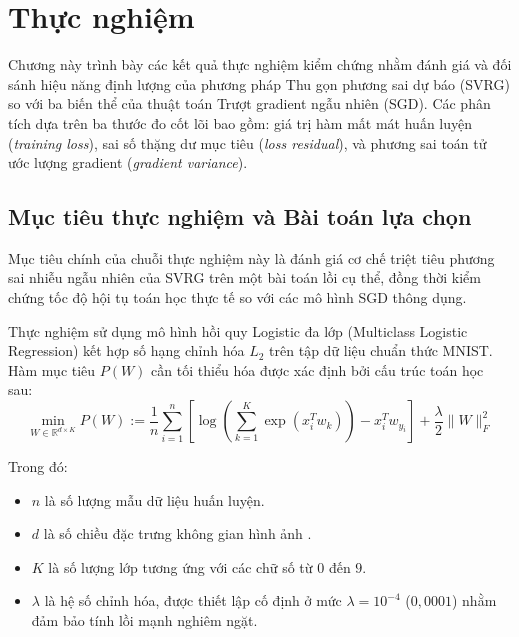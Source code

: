 \chapter{Thực nghiệm}

Chương này trình bày các kết quả thực nghiệm kiểm chứng nhằm đánh giá và đối sánh hiệu năng định lượng của phương pháp Thu gọn phương sai dự báo (SVRG) so với ba biến thể của thuật toán Trượt gradient ngẫu nhiên (SGD). Các phân tích dựa trên ba thước đo cốt lõi bao gồm: giá trị hàm mất mát huấn luyện (\textit{training loss}), sai số thặng dư mục tiêu (\textit{loss residual}), và phương sai toán tử ước lượng gradient (\textit{gradient variance}).

\section{Mục tiêu thực nghiệm và Bài toán lựa chọn}

Mục tiêu chính của chuỗi thực nghiệm này là đánh giá cơ chế triệt tiêu phương sai nhiễu ngẫu nhiên của SVRG trên một bài toán lồi cụ thể, đồng thời kiểm chứng tốc độ hội tụ toán học thực tế so với các mô hình SGD thông dụng.

Thực nghiệm sử dụng mô hình hồi quy Logistic đa lớp (Multiclass Logistic Regression) kết hợp số hạng chỉnh hóa $L_2$ trên tập dữ liệu chuẩn thức MNIST. Hàm mục tiêu $P(W)$ cần tối thiểu hóa được xác định bởi cấu trúc toán học sau:
\begin{equation}\label{eq:exp_objective_convex}
\min_{W \in \mathbb{R}^{d \times K}} P(W) := \frac{1}{n} \sum_{i=1}^n \left[ \log \left( \sum_{k=1}^K \exp(x_i^T w_k) \right) - x_i^T w_{y_i} \right] + \frac{\lambda}{2} \|W\|_F^2
\end{equation}

Trong đó:
\begin{itemize}
    \item $n $ là số lượng mẫu dữ liệu huấn luyện.
    \item $d $ là số chiều đặc trưng không gian hình ảnh .
    \item $K$ là số lượng lớp tương ứng với các chữ số từ $0$ đến $9$.
    \item $\lambda$ là hệ số chỉnh hóa, được thiết lập cố định ở mức $\lambda = 10^{-4}$ ($0,0001$) nhằm đảm bảo tính lồi mạnh nghiêm ngặt.
\end{itemize}

